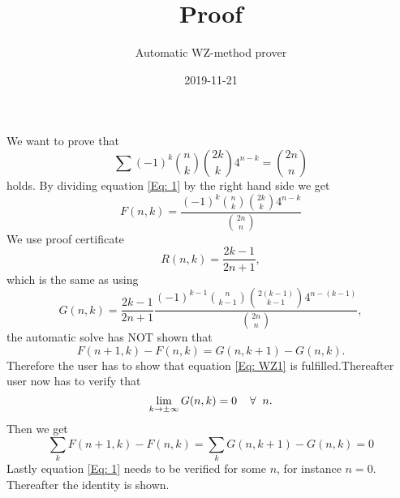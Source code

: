 \documentclass{article}
\title{Proof}
\author{Automatic WZ-method prover}
\date{2019-11-21}
\let\oldforall\forall
\renewcommand{\forall}{\hspace*{2mm}\oldforall\hspace*{1mm}}
\begin{document}
\maketitle
We want to prove that
\begin{equation}\label{Eq: 1}
\sum (-1)^k\binom{n}{k}\binom{2k}{k}4^{n-k}=\binom{2n}{n}
\end{equation}
holds. By dividing equation \ref{Eq: 1} by the right hand side we get
\begin{equation}
F(n,k)=\frac{(-1)^{k}\binom{n}{k}\binom{2k}{k}4^{n-k}}{\binom{2n}{n}}
\end{equation}
We use proof certificate
\begin{equation}
R(n,k)=\frac{2k-1}{2n+1},
\end{equation}
which is the same as using
\begin{equation}
G(n,k)=\frac{2k-1}{2n+1}\frac{(-1)^{k-1}\binom{n}{k-1}\binom{2(k-1)}{k-1}4^{n-(k-1)}}{\binom{2n}{n}},
\end{equation}
the automatic solve has NOT shown that
\begin{equation}\label{Eq: WZ1}
F(n+1,k)-F(n,k)=G(n,k+1)-G(n,k).
\end{equation}
Therefore the user has to show that equation \ref{Eq: WZ1} is fulfilled.Thereafter user now has to verify that
\begin{equation}
\lim_{k\to\pm\infty}G(n,k)=0\forall n.
\end{equation}
Then we get
\begin{equation}
\sum_k F(n+1,k)-F(n,k)=\sum_k G(n,k+1)-G(n,k)=0\end{equation}Lastly equation \ref{Eq: 1} needs to be verified for some $n$, for instance $n=0$. Thereafter the identity is shown.
\end{document}
